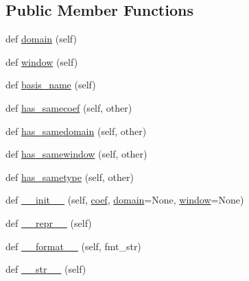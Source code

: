 \subsection*{Public Member Functions}
\begin{DoxyCompactItemize}
\item 
def \hyperlink{classnumpy_1_1polynomial_1_1__polybase_1_1ABCPolyBase_ae12c8836059cacb9c60e4831c5dc5fc4}{domain} (self)
\item 
def \hyperlink{classnumpy_1_1polynomial_1_1__polybase_1_1ABCPolyBase_a49f06edc861899d6a6aba226255fd445}{window} (self)
\item 
def \hyperlink{classnumpy_1_1polynomial_1_1__polybase_1_1ABCPolyBase_af165175903af028d6be1002e12699383}{basis\+\_\+name} (self)
\item 
def \hyperlink{classnumpy_1_1polynomial_1_1__polybase_1_1ABCPolyBase_adefec6d13ec09f96320af218a66ec092}{has\+\_\+samecoef} (self, other)
\item 
def \hyperlink{classnumpy_1_1polynomial_1_1__polybase_1_1ABCPolyBase_a9e80ac9e9beba9fbfe0e4b6b5e4ce5d1}{has\+\_\+samedomain} (self, other)
\item 
def \hyperlink{classnumpy_1_1polynomial_1_1__polybase_1_1ABCPolyBase_a8825e7bb7baec17b7557924d08f6d918}{has\+\_\+samewindow} (self, other)
\item 
def \hyperlink{classnumpy_1_1polynomial_1_1__polybase_1_1ABCPolyBase_adfdcfcbcb5d67be08c3af00e05b5af26}{has\+\_\+sametype} (self, other)
\item 
def \hyperlink{classnumpy_1_1polynomial_1_1__polybase_1_1ABCPolyBase_abe51e52103727401042c5ccf18cbc06c}{\+\_\+\+\_\+init\+\_\+\+\_\+} (self, \hyperlink{classnumpy_1_1polynomial_1_1__polybase_1_1ABCPolyBase_abc32ea31245612c296b11a3dcca1e922}{coef}, \hyperlink{classnumpy_1_1polynomial_1_1__polybase_1_1ABCPolyBase_aaf29f269a505cdb48cc84467414a497b}{domain}=None, \hyperlink{classnumpy_1_1polynomial_1_1__polybase_1_1ABCPolyBase_a193a5e19ba940ca6b5a441151c0278e4}{window}=None)
\item 
def \hyperlink{classnumpy_1_1polynomial_1_1__polybase_1_1ABCPolyBase_a431d7063764ca09db62789b63c701b96}{\+\_\+\+\_\+repr\+\_\+\+\_\+} (self)
\item 
def \hyperlink{classnumpy_1_1polynomial_1_1__polybase_1_1ABCPolyBase_ae5a76912f57e35368542b4a323a599db}{\+\_\+\+\_\+format\+\_\+\+\_\+} (self, fmt\+\_\+str)
\item 
def \hyperlink{classnumpy_1_1polynomial_1_1__polybase_1_1ABCPolyBase_afc795fd87667e5e2077d8b427173952d}{\+\_\+\+\_\+str\+\_\+\+\_\+} (self)

\end{DoxyCompactItemize}
